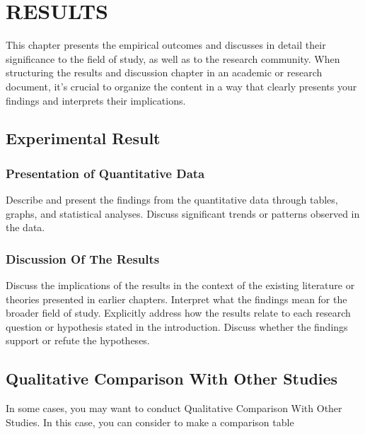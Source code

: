 \chapter{RESULTS}

This chapter presents the empirical outcomes and discusses in detail their significance to the field of study, as well as to the research community. When structuring the results and discussion chapter in an academic or research document, it's crucial to organize the content in a way that clearly presents your findings and interprets their implications. 


\section{Experimental Result}



\subsection{Presentation of Quantitative Data}
Describe and present the findings from the quantitative data through tables, graphs, and statistical analyses. Discuss significant trends or patterns observed in the data.




\subsection{Discussion Of The Results}

Discuss the implications of the results in the context of the existing literature or theories presented in earlier chapters. Interpret what the findings mean for the broader field of study.
Explicitly address how the results relate to each research question or hypothesis stated in the introduction. Discuss whether the findings support or refute the hypotheses.




\section{Qualitative Comparison With Other Studies}

In some cases, you may want to conduct Qualitative Comparison With Other Studies. In this case, you can consider to make a comparison table

